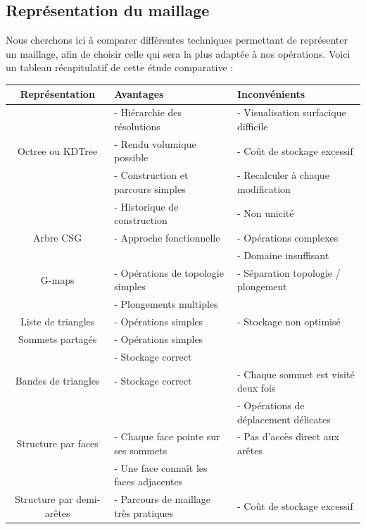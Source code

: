 \documentclass[a4paper]{memoir}
\begin{document}
			\subsection{Représentation du maillage}
				Nous cherchons ici à comparer différentes techniques permettant de représenter un maillage, afin de choisir celle qui sera la plus adaptée à nos opérations. Voici un tableau récapitulatif de cette étude comparative :
				\begin{table}[H]
					\begin{small}
						\begin{tabular}{| c | l | l |}
							\hline
							\textbf{Représentation} & \textbf{Avantages} & \textbf{Inconvénients}\\
							\hline
							 & - Hiérarchie des résolutions & - Visualisation surfacique difficile\\
							Octree ou KDTree & - Rendu volumique possible & - Coût de stockage excessif\\
							 & - Construction et parcours simples & - Recalculer à chaque modification\\
							\hline
							 & - Historique de construction & - Non unicité\\
							Arbre CSG & - Approche fonctionnelle & - Opérations complexes\\
							 &  & - Domaine insuffisant\\
							\hline
							G-maps & - Opérations de topologie simples & - Séparation topologie / plongement\\
							 & - Plongements multiples & \\
							\hline
							Liste de triangles & - Opérations simples & - Stockage non optimisé\\
							\hline
							Sommets partagés & - Opérations simples & \\
							 & - Stockage correct & \\
							\hline
							Bandes de triangles & - Stockage correct & - Chaque sommet est visité deux fois\\
							 &  & - Opérations de déplacement délicates\\
							\hline
							Structure par faces & - Chaque face pointe sur ses sommets & - Pas d'accès direct aux arêtes\\
							 & - Une face connaît les faces adjacentes & \\
							\hline
							Structure par demi-arêtes & - Parcours de maillage très pratiques & - Coût de stockage excessif\\

\end{tabular}
\end{small}
\end{table}
\end{document}
